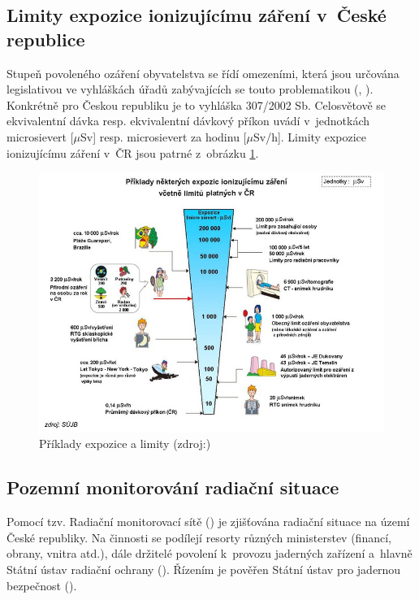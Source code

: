\subsection{Limity expozice ionizujícímu záření v~České republice}
\label{sub:limity} Stupeň povoleného ozáření obyvatelstva se řídí
omezeními, která jsou určována legislativou ve vyhláškách úřadů
zabývajících se touto problematikou (, ). Konkrétně
pro Českou republiku je to vyhláška 307/2002 Sb. Celosvětově se
ekvivalentní dávka resp. ekvivalentní dávkový příkon uvádí
v~jednotkách microsievert [$\mu$Sv] resp. microsievert za hodinu
[$\mu$Sv/h]. Limity expozice ionizujícímu záření v~ČR jsou patrné
z~obrázku \ref{fig:davkyCR}. \cite{suroPriRadOch}

\begin{figure}[H] \centering
    \includegraphics[scale=0.6]{./pictures/davkyCR.jpeg}
      	\caption[Příklady expozice a limity]{Příklady expozice a
limity (zdroj:\cite{suroOcek})}
    	\label{fig:davkyCR}
\end{figure}

\subsection{Pozemní monitorování radiační situace} Pomocí
tzv. Radiační monitorovací sítě () je zjišťována radiační
situace na území České republiky. Na činnosti  se podílejí
resorty různých ministerstev (financí, obrany, vnitra atd.), dále
držitelé povolení k~provozu jaderných zařízení a~hlavně Státní ústav
radiační ochrany (). Řízením je pověřen Státní ústav pro
jadernou bezpečnost (). \cite{suroRMS}

